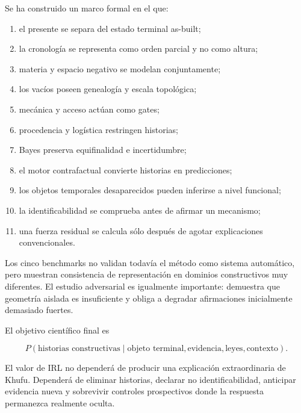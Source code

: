 Se ha construido un marco formal en el que:

\begin{enumerate}
\item el presente se separa del estado terminal as-built;
\item la cronología se representa como orden parcial y no como altura;
\item materia y espacio negativo se modelan conjuntamente;
\item los vacíos poseen genealogía y escala topológica;
\item mecánica y acceso actúan como gates;
\item procedencia y logística restringen historias;
\item Bayes preserva equifinalidad e incertidumbre;
\item el motor contrafactual convierte historias en predicciones;
\item los objetos temporales desaparecidos pueden inferirse a nivel funcional;
\item la identificabilidad se comprueba antes de afirmar un mecanismo;
\item una fuerza residual se calcula sólo después de agotar explicaciones convencionales.
\end{enumerate}

Los cinco benchmarks no validan todavía el método como sistema automático, pero muestran consistencia de representación en dominios constructivos muy diferentes. El estudio adversarial es igualmente importante: demuestra que geometría aislada es insuficiente y obliga a degradar afirmaciones inicialmente demasiado fuertes.

El objetivo científico final es

\begin{equation}
\boxed{
P(
\text{historias constructivas}
\mid
\text{objeto terminal},
\text{evidencia},
\text{leyes},
\text{contexto}
).
}
\end{equation}

El valor de IRL no dependerá de producir una explicación extraordinaria de Khufu. Dependerá de eliminar historias, declarar no identificabilidad, anticipar evidencia nueva y sobrevivir controles prospectivos donde la respuesta permanezca realmente oculta.
